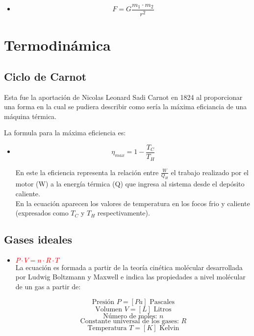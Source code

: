 \documentclass[letterpaper, 12pt]{article}
\begin{document}
    \begin{itemize}
        \item[\textcolor{Simbolos}{\circledast}] $$F=G\frac{m_1\cdot m_{2}}{r^{2}}$$
    \end{itemize}
    
    
    
    
       
\newpage
       
 \pagestyle{fancy}
            \fancyhf{}
            \cfoot{\thepage}
                 
\section*{Termodinámica}

\subsection*{Ciclo de Carnot}

Esta fue la aportación de Nicolas Leonard Sadi Carnot en 1824 al proporcionar una forma en la cual se pudiera describir como sería la máxima eficiancia de una máquina térmica.

La formula para la máxima eficiencia es:
\begin{itemize}
    \item[\textcolor{Simbolos}{\oplus}]
    $$\eta_{max} = 1-\frac{T_{C}}{T_{H}}$$
    
    En este la eficiencia representa la relación entre $\frac{W}{Q_{H}}$ el trabajo realizado por el motor (W) a la energía térmica (Q) que ingresa al sistema desde el depósito caliente.\\
    
    En la ecuación aparecen los valores de temperatura en los focos frio y caliente (expresados como $T_{C}$ y $T_{H}$ respectivamente).
\end{itemize}    
    \subsection*{Gases ideales}
    
    \begin{itemize}
        \item [\textcolor{Simbolos}{\circ}] \textcolor{red}{$P \cdot V = n\cdot R \cdot T$} \\
        
        La ecuación es formada a partir de la teoría cinética molécular desarrollada por Ludwig Boltzmann y Maxwell e indica las propiedades a nivel molécular de un gas a partir de:
        
        $$\textrm{Presión } P = [Pa] \textrm{ Pascales}$$ 
        $$\textrm{Volumen } V = [L] \textrm{ Litros}$$ 
        $$\textrm{Número de moles: } n $$ 
        $$\textrm{Constante universal de los gases: } R$$ 
        $$\textrm{Temperatura } T = [K] \textrm{ Kelvin}$$ 
    \end{itemize}
    
\end{document}
